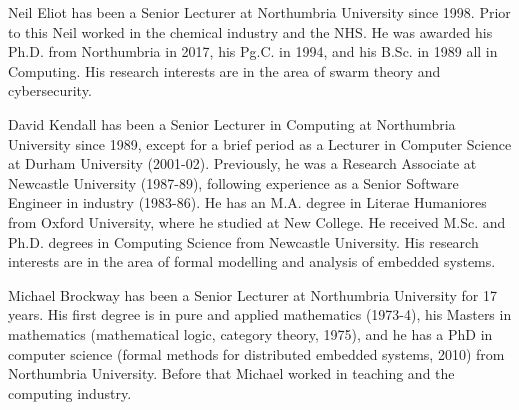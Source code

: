 \documentclass{ieeeaccess}
\begin{document}
\clearpage




\begin{IEEEbiography}{Neil Eliot} has been a Senior Lecturer at Northumbria University since 1998. Prior to this Neil worked in the chemical industry and the NHS. He was awarded his Ph.D. from Northumbria in 2017, his Pg.C. in 1994, and his B.Sc. in 1989 all in Computing. His research interests are in the area of swarm theory and cybersecurity. 
\end{IEEEbiography}

\begin{IEEEbiography}{David Kendall}
has been a Senior Lecturer in Computing at Northumbria University since 1989, except for a brief period as a Lecturer in Computer Science at Durham University (2001-02). Previously, he was a Research Associate at Newcastle University (1987-89), following experience as a Senior Software Engineer in industry (1983-86). He has an M.A. degree in Literae Humaniores from Oxford University, where he studied at New College. He received M.Sc. and Ph.D. degrees in Computing Science from Newcastle University. His research interests are in the area of formal modelling and analysis of embedded systems. 
\end{IEEEbiography}

\begin{IEEEbiography}{Michael Brockway}
has been a Senior Lecturer at Northumbria University for 17 years. His first degree is in pure and applied mathematics (1973-4), his Masters in mathematics (mathematical logic, category theory, 1975), and he has a PhD in computer science (formal methods for distributed embedded systems, 2010) from Northumbria University. Before that Michael worked in teaching and the computing industry.
\end{IEEEbiography}

\EOD
\end{document}
